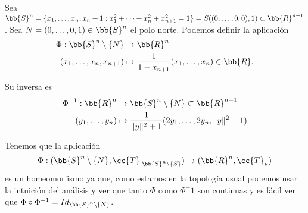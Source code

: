 \begin{ejemplo}
\begin{itemize}
        Sea $\bb{S}^{n}=\{x_1, \dots, x_n, x_n+1 : x_1^2 + \dots + x_n^2 + x_{n+1}^2 = 1\} = S((0,\dots,0,0), 1)\subset \bb{R}^{n+1}$. Sea $N=(0,\dots,0,1)\in \bb{S}^n$ el polo norte. Podemos definir la aplicación 
        \begin{align*}
            \Phi : \bb{S}^n\setminus \{N\} &\to \bb{R}^n\\
            (x_1, \dots, x_n, x_{n+1}) &\mapsto \frac{1}{1-x_{n+1}}(x_1, \dots, x_n)\in \bb{R}.
        \end{align*}



                




        Su inversa es 
        \begin{align*}
            \Phi^{-1}: \bb{R}^n &\to \bb{S}^n \setminus \{N\}\subset \bb{R}^{n+1}\\
            (y_1, \dots, y_n) & \mapsto \frac{1}{\|y\|^2+1}(2y_1, \dots, 2y_n, \|y\|^2-1)
        \end{align*}

        Tenemos que la aplicación 
        \begin{align*}
            \Phi:(\bb{S}^n\setminus \{N\}, \cc{T}_{|\bb{S}^n\setminus \{S\}}) \to (\bb{R}^n, \cc{T}_u)
        \end{align*}
        es un homeomorfismo ya que, como estamos en la topología usual podemos usar la intuición del análisis y ver que tanto $\Phi$ como $\Phi^-1$ son continuas y es fácil ver que $\Phi \circ \Phi^{-1} = Id_{\bb{S}^n\setminus \{N\}}$.


\end{itemize}
\end{ejemplo}
